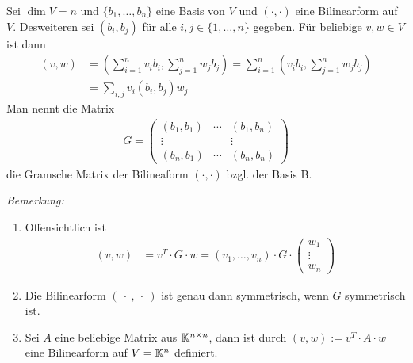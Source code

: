 
\begin{mydef}\label{gramscheMatrix}

Sei $\dim V = n$ und $\{ b_1, \ldots, b_n \}$ eine Basis von $V$ und $(\cdot ,\cdot )$ eine Bilinearform auf $V$.
Desweiteren sei $(b_i, b_j)$ für alle $i, j \in \{1, \ldots, n \}$ gegeben.
Für beliebige $v, w \in V$ ist dann
\begin{align*}
(v,w)   & = \left( \sum\limits_{i = 1}^n v_i b_i, \sum\limits_{j = 1}^n w_j b_j \right) = \sum\limits_{i = 1}^n \left(v_i b_i ,\sum\limits_{j = 1}^n w_j b_j \right) \\
        & = \sum\limits_{i, j} v_i(b_i, b_j) w_j
\end{align*}
Man nennt die Matrix
\begin{align*}
G =
\begin{pmatrix}
    (b_1,b_1) & \cdots & (b_1,b_n) \\
    \vdots & & \vdots \\
    (b_n,b_1) & \cdots & (b_n,b_n)
\end{pmatrix}
\end{align*}
die Gramsche Matrix der Bilineaform $(\cdot , \cdot )$ bzgl. der Basis B.
\end{mydef}
\textit{Bemerkung:}
\begin{enumerate}
\item \label{gramscheMatrix-1} Offensichtlich ist
\begin{align*}
(v,w) & = v^T \cdot G \cdot w = (v_1, \ldots, v_n) \cdot G \cdot \begin{pmatrix} w_1\\ \vdots \\ w_n\end{pmatrix} 
\end{align*}
\item \label{gramscheMatrix-2} Die Bilinearform $(\ \cdot \ , \ \cdot \ )$ ist genau dann symmetrisch, wenn $G$ symmetrisch ist.
\item \label{gramscheMatrix-3} Sei $A$ eine beliebige Matrix aus $\mathbb{K}^{n \times n}$, dann ist durch $(v,w) := v^T \cdot A \cdot w$ eine Bilinearform auf $V = \mathbb{K}^n$ definiert.
\end{enumerate}


